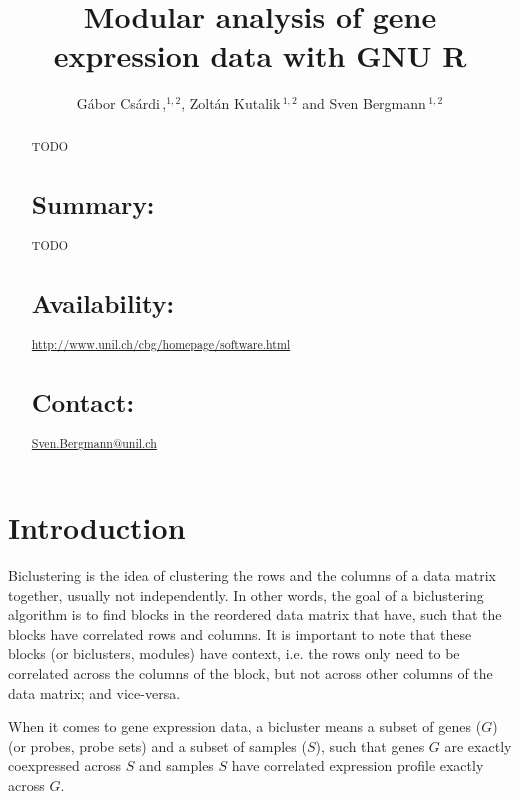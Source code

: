 \documentclass{bioinfo}
\begin{document}

\title[Modular analysis]{Modular analysis of gene expression data with
  GNU R}
\author[G\'abor Cs\'ardi \textit{et~al}]{G\'abor Cs\'ardi\,,$^{1,2}$,
  Zolt\'an Kutalik\,$^{1,2}$ and Sven Bergmann\,$^{1,2}$}
\address{$^{1}$Department of Medical Genetics, and 
  $^{2}$Swiss Institute of Bioinformatics,
  University of Lausanne, Rue de Bugnon 27, CH-1005 Lausanne,
  Switzerland.}



\maketitle

\begin{abstract}
TODO
\section{Summary:} TODO
\section{Availability:}
\href{http://www.unil.ch/cbg/homepage/software.html}%
{http://www.unil.ch/cbg/homepage/software.html}
\section{Contact:} \href{Sven.Bergmann@unil.ch}{Sven.Bergmann@unil.ch}
\end{abstract}

\section{Introduction}


Biclustering is the idea of clustering the rows and the columns of a
data matrix together, usually not independently. In other words, the
goal of a biclustering algorithm is to find blocks in the reordered
data matrix that have, such that the blocks have correlated rows and
columns. It is important to note that these blocks (or biclusters,
modules) have context, i.e. the rows only need to be correlated across
the columns of the block, but not across other columns of the data
matrix; and vice-versa.

When it comes to gene expression data, a bicluster means a subset of
genes ($G$) (or probes, probe sets) and a subset of samples ($S$),
such that genes $G$ are exactly coexpressed across $S$ and samples $S$
have correlated expression profile exactly across $G$.
\end{document}
